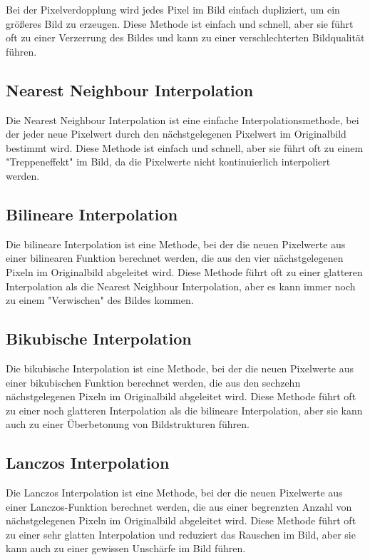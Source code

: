 Bei der Pixelverdopplung wird jedes Pixel im Bild einfach dupliziert, um ein größeres Bild zu erzeugen. 
Diese Methode ist einfach und schnell, aber sie führt oft zu einer Verzerrung des Bildes und kann zu einer verschlechterten Bildqualität führen.

\subsection{Nearest Neighbour Interpolation}

Die Nearest Neighbour Interpolation ist eine einfache Interpolationsmethode, bei der jeder neue Pixelwert durch den nächstgelegenen Pixelwert im Originalbild bestimmt wird. 
Diese Methode ist einfach und schnell, aber sie führt oft zu einem "Treppeneffekt" im Bild, da die Pixelwerte nicht kontinuierlich interpoliert werden.

\subsection{Bilineare Interpolation}

Die bilineare Interpolation ist eine Methode, bei der die neuen Pixelwerte aus einer bilinearen Funktion berechnet werden, die aus den vier nächstgelegenen Pixeln im Originalbild abgeleitet wird. 
Diese Methode führt oft zu einer glatteren Interpolation als die Nearest Neighbour Interpolation, aber es kann immer noch zu einem "Verwischen" des Bildes kommen.

\subsection{Bikubische Interpolation}

Die bikubische Interpolation ist eine Methode, bei der die neuen Pixelwerte aus einer bikubischen Funktion berechnet werden, die aus den sechzehn nächstgelegenen Pixeln im Originalbild abgeleitet wird.
Diese Methode führt oft zu einer noch glatteren Interpolation als die bilineare Interpolation, aber sie kann auch zu einer Überbetonung von Bildstrukturen führen.

\subsection{Lanczos Interpolation}
Die Lanczos Interpolation ist eine Methode, bei der die neuen Pixelwerte aus einer Lanczos-Funktion berechnet werden, die aus einer begrenzten Anzahl von nächstgelegenen Pixeln im Originalbild abgeleitet wird. 
Diese Methode führt oft zu einer sehr glatten Interpolation und reduziert das Rauschen im Bild, aber sie kann auch zu einer gewissen Unschärfe im Bild führen.


